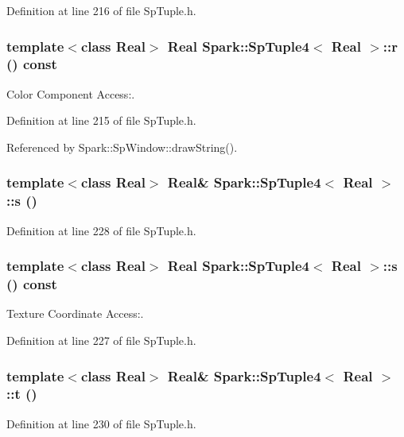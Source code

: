 Definition at line 216 of file Sp\-Tuple.h.
\subsubsection{\setlength{\rightskip}{0pt plus 5cm}template$<$class Real$>$ Real {\bf Spark::Sp\-Tuple4}$<$ Real $>$::r () const\hspace{0.3cm}{\tt  [inline]}}\label{classSpark_1_1SpTuple4_a10}


Color Component Access:. 

Definition at line 215 of file Sp\-Tuple.h.

Referenced by Spark::Sp\-Window::draw\-String().
\subsubsection{\setlength{\rightskip}{0pt plus 5cm}template$<$class Real$>$ Real\& {\bf Spark::Sp\-Tuple4}$<$ Real $>$::s ()\hspace{0.3cm}{\tt  [inline]}}\label{classSpark_1_1SpTuple4_a19}


Definition at line 228 of file Sp\-Tuple.h.
\subsubsection{\setlength{\rightskip}{0pt plus 5cm}template$<$class Real$>$ Real {\bf Spark::Sp\-Tuple4}$<$ Real $>$::s () const\hspace{0.3cm}{\tt  [inline]}}\label{classSpark_1_1SpTuple4_a18}


Texture Coordinate Access:. 

Definition at line 227 of file Sp\-Tuple.h.
\subsubsection{\setlength{\rightskip}{0pt plus 5cm}template$<$class Real$>$ Real\& {\bf Spark::Sp\-Tuple4}$<$ Real $>$::t ()\hspace{0.3cm}{\tt  [inline]}}\label{classSpark_1_1SpTuple4_a21}


Definition at line 230 of file Sp\-Tuple.h.

